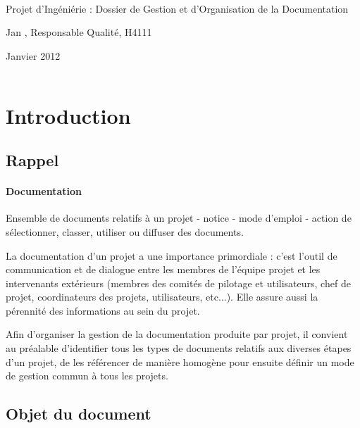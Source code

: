 \documentclass[a4paper]{article}
\begin{document}
\begin{titlepage}
~ 
\vfill
	\begin{center}
		\begin{Huge}
		Projet d'Ingéniérie : Dossier de Gestion et d'Organisation de la Documentation\\
		\end{Huge} 
\vfill
		Jan , Responsable Qualité, H4111
\vfill		
		\begin{Large}
		Janvier 2012
		\end{Large}
\vfill
	\begin{tabular}{|c|c|c|c|}
 	 \hline
	\end{tabular}
	\end{center}
\vfill
\end{titlepage}
\newpage
\tableofcontents
\newpage


\section{Introduction}

\subsection{Rappel}

\paragraph{Documentation} Ensemble de documents relatifs à un projet - notice - mode d’emploi - action de sélectionner, classer, utiliser ou diffuser des documents.

La documentation d’un projet a une importance primordiale : c’est l’outil de communication et de dialogue entre les membres de l’équipe projet et les intervenants extérieurs (membres des comités de pilotage et utilisateurs, chef de projet, coordinateurs des projets, utilisateurs, etc...). Elle assure aussi la pérennité des informations au sein du projet.

Afin d’organiser la gestion de la documentation produite par projet, il convient au préalable d’identifier tous les types de documents relatifs aux diverses étapes d’un projet, de les référencer de manière homogène pour ensuite définir un mode de gestion commun à tous les projets.

\subsection{Objet du document}
\end{document}
